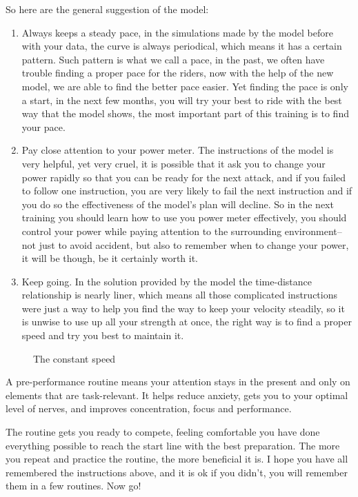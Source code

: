 \documentclass[12pt]{article}
\begin{document}
So here are the general suggestion of the model:
\begin{enumerate}
    \item Always keeps a steady pace, in the simulations made by the model before with your data, the curve is always periodical, which means it has a certain pattern. Such 
    pattern is what we call a pace, in the past, we often have trouble finding a proper pace for the riders, now with the help of the new model, we are able to find the
    better pace easier. Yet finding the pace is only a start, in the next few months, you will try your best to ride with the best way that the model shows, the most important part of this training is to find your pace.
    \item  Pay close attention to your power meter. The instructions of the model is very helpful, yet very cruel, it is possible that it ask you to change your 
    power rapidly so that you can be ready for the next attack, and if you failed to follow one instruction, you are very likely to fail the next instruction and if you do so
    the effectiveness of the model's plan will decline.  So in the next training you should learn how to use you power meter effectively, you should control your power while
    paying attention to the surrounding environment-- not just to avoid accident, but also to remember when to change your power, it will be though, be it certainly worth it.
    \item Keep going. In the solution provided by the model the time-distance relationship is nearly liner, which means all those complicated instructions were just a way to help
    you find the way to keep your velocity steadily, so it is unwise to use up all your strength at once, the right way is to find a proper speed and try you best to maintain 
    it.
\end{enumerate}

\begin{figure}[H]
    \centering
    
    \caption{The constant speed}
\end{figure}
A pre-performance routine means your attention stays in the present and only on elements that are task-relevant. It helps reduce anxiety, gets you to your optimal level
of nerves, and improves concentration, focus and performance.

The routine gets you ready to compete, feeling comfortable you have done everything possible to reach the start line with the best preparation. The more you repeat and
practice the routine, the more beneficial it is. I hope you have all remembered the instructions above, and it is ok if you didn't, you will remember them in a few routines.
Now go!




\end{document}
